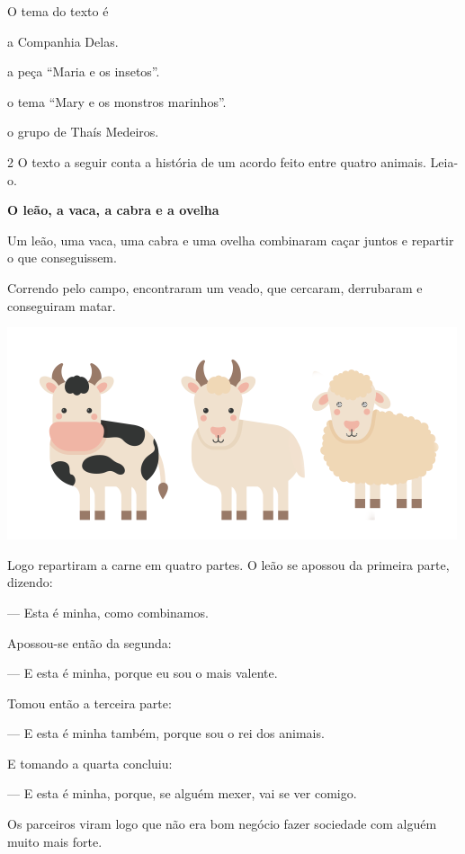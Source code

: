 \pagebreak
O tema do texto é

\begin{escolha}
\item a Companhia Delas.

\item a peça ``Maria e os insetos''.

\item o tema ``Mary e os monstros marinhos''.

\item o grupo de Thaís Medeiros.
\end{escolha}

\num{2} O texto a seguir conta a história de um acordo feito entre quatro
animais. Leia-o.

\begin{myquote}
\textbf{O leão, a vaca, a cabra e a ovelha}

Um leão, uma vaca, uma cabra e uma ovelha combinaram
caçar juntos e repartir o que conseguissem.

Correndo pelo campo, encontraram um veado, que
cercaram, derrubaram e conseguiram matar.

\begin{center}
\includegraphics[width=\textwidth]{./media/image23d.png}
\end{center}

Logo repartiram a carne em quatro partes. O leão se
apossou da primeira parte, dizendo:

--- Esta é minha, como combinamos.

Apossou-se então da segunda:

--- E esta é minha, porque eu sou o mais valente.

Tomou então a terceira parte:

--- E esta é minha também, porque sou o rei dos
animais.

E tomando a quarta concluiu:

--- E esta é minha, porque, se alguém mexer, vai se ver
comigo.

Os parceiros viram logo que não era bom negócio fazer
sociedade com alguém muito mais forte.

\end{myquote}

